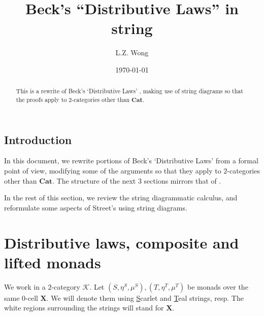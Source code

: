 \documentclass{article}
\title{Beck's ``Distributive Laws'' in string}
\author{L.Z. Wong}
\date\today
\numberwithin{equation}{section}
\theoremstyle{definition}
\newcommand{\cat}[1]{\mathbf{#1}}
\newcommand{\Cat}{\cat{Cat}}
\newcommand{\varcat}[1]{\mathbf{#1}}
\newcommand{\cX}{\varcat{X}}
\newcommand{\cK}{\mathcal{K}}
\begin{document}
\maketitle
\tableofcontents


	\begin{abstract}
		This is a rewrite of Beck's `Distributive Laws' \cite{beck1969distributive}, making use of string diagrams so that the proofs apply to $2$-categories other than $\Cat$.
	\end{abstract}

	\subsection{Introduction}
		In this document, we rewrite portions of Beck's `Distributive Laws' \cite{beck1969distributive} from a formal point of view, modifying some of the arguments so that they apply to $2$-categories other than $\Cat$. The structure of the next 3 sections mirrors that of \cite{beck1969distributive}.

		In the rest of this section, we review the string diagrammatic calculus, and reformulate some aspects of Street's \cite{street1972formal} using string diagrams.

\pagebreak

\section{Distributive laws, composite and lifted monads}
	\label{main}

	We work in a $2$-category $\cK$. Let $(S,\eta^S,\mu^S),(T,\eta^T,\mu^T)$ be monads over the same 0-cell $\cX$. We will denote them using \underline{S}carlet and \underline{T}eal strings, resp. The white regions surrounding the strings will stand for $\cX$.	 
\end{document}
